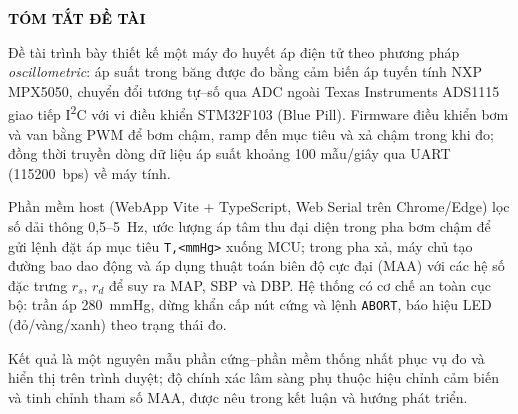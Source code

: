 \begin{center}
	\textbf{{\Large\textcolor{black}{TÓM TẮT ĐỀ TÀI}}}
\end{center}

\vspace{1cm}

\hspace*{2cm}
Đề tài trình bày thiết kế một máy đo huyết áp điện tử theo phương pháp \textit{oscillometric}: áp suất trong băng được đo bằng cảm biến áp tuyến tính NXP MPX5050, chuyển đổi tương tự--số qua ADC ngoài Texas Instruments ADS1115 giao tiếp I\textsuperscript{2}C với vi điều khiển STM32F103 (Blue Pill). Firmware điều khiển bơm và van bằng PWM để bơm chậm, ramp đến mục tiêu và xả chậm trong khi đo; đồng thời truyền dòng dữ liệu áp suất khoảng 100 mẫu/giây qua UART (115200~bps) về máy tính.

Phần mềm host (WebApp Vite + TypeScript, Web Serial trên Chrome/Edge) lọc số dải thông 0{,}5--5~Hz, ước lượng áp tâm thu đại diện trong pha bơm chậm để gửi lệnh đặt áp mục tiêu \texttt{T,<mmHg>} xuống MCU; trong pha xả, máy chủ tạo đường bao dao động và áp dụng thuật toán biên độ cực đại (MAA) với các hệ số đặc trưng \(r_s\), \(r_d\) để suy ra MAP, SBP và DBP. Hệ thống có cơ chế an toàn cục bộ: trần áp 280~mmHg, dừng khẩn cấp nút cứng và lệnh \texttt{ABORT}, báo hiệu LED (đỏ/vàng/xanh) theo trạng thái đo.

Kết quả là một nguyên mẫu phần cứng--phần mềm thống nhất phục vụ đo và hiển thị trên trình duyệt; độ chính xác lâm sàng phụ thuộc hiệu chỉnh cảm biến và tinh chỉnh tham số MAA, được nêu trong kết luận và hướng phát triển.

